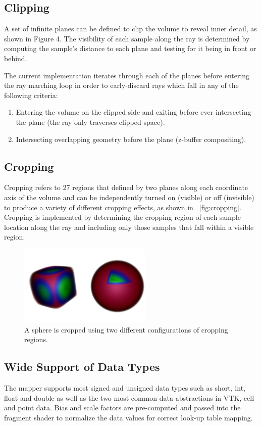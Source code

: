 \subsection{Clipping}
\label{clipping}
A set of infinite planes can be defined to clip the volume to reveal inner
detail, as shown in Figure 4.  The visibility of each sample along the ray
is determined by computing the sample's distance to each plane and testing
for it being in front or behind.

The current implementation iterates through each of the planes before entering
the ray marching loop in order to early-discard rays which fall in any of the
following criteria:

\begin{enumerate}
\item Entering the volume on the clipped side and exiting before ever
	intersecting the plane (the ray only traverses clipped space).
\item Intersecting overlapping geometry before the plane (z-buffer compositing).
\end{enumerate}

\subsection{Cropping} Cropping refers to 27 regions that defined by two
planes along each coordinate axis of the volume and can be independently turned
on (visible) or off (invisible) to produce a variety of different cropping
effects, as shown in ~\autoref{fig:cropping}. Cropping is implemented by
determining the cropping region of each sample location along the ray and
including only those samples that fall within a visible region.

\begin{figure}[htb]
  \centering
  \includegraphics[width=2.5in]{SphereCropping.png}
  \caption{A sphere is cropped using two different configurations of cropping regions.}
  \label{fig:cropping}
\end{figure}

\subsection{Wide Support of Data Types}
The mapper supports most signed and unsigned data types such as short, int,
float and double as well as the two most common data abstractions in VTK,
cell and point data.  Bias and scale factors are pre-computed and passed into
the fragment shader to normalize the data values for correct look-up table
mapping.

